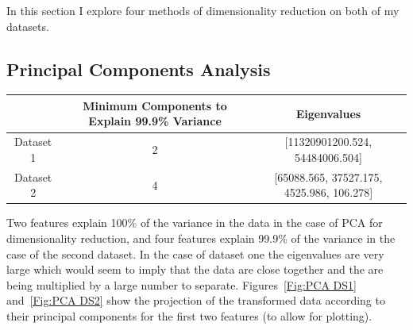 In this section I explore four methods of dimensionality reduction on both of my datasets.

\subsection{Principal Components Analysis}\label{subsec:principal-components-analysis}
\begin{center}
    \begin{tabular}{|c| c |c|}
        \hline
        & Minimum Components to Explain 99.9\% Variance & Eigenvalues                               \\
        \hline
        \hline
        Dataset 1 & 2                                             & [11320901200.524, 54484006.504]           \\
        \hline
        Dataset 2 & 4                                             & [65088.565, 37527.175, 4525.986, 106.278] \\
        \hline
    \end{tabular}
\end{center}
Two features explain 100\% of the variance in the data in the case of PCA for dimensionality reduction, and four features explain
99.9\% of the variance in the case of the second dataset.
In the case of dataset one the eigenvalues are very large which would seem to imply that the data are close together and
the are being multiplied by a large number to separate.
Figures~\ref{Fig:PCA DS1} and~\ref{Fig:PCA DS2} show the projection of the transformed data according to their principal
components for the first two features (to allow for plotting).
